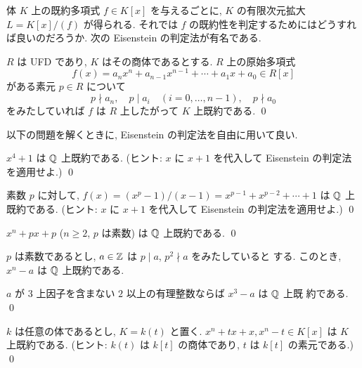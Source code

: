 \documentclass[12pt,twoside]{jarticle}
\begin{document}
体 $K$ 上の既約多項式 $f\in K[x]$ を与えるごとに, 
$K$ の有限次元拡大 $L=K[x]/(f)$ が得られる.
それでは $f$ の既約性を判定するためにはどうすれば良いのだろうか.
次の Eisenstein の判定法が有名である.

\begin{question}
  $R$ は UFD であり, $K$ はその商体であるとする.  
  $R$ 上の原始多項式
  \begin{equation*}
    f(x)= a_n x^n + a_{n-1}x^{n-1} + \cdots + a_1 x + a_0 \in R[x]
  \end{equation*}
  がある素元 $p\in R$ について
  \begin{equation*}
    p\nmid a_n, \quad
    p\mid a_i \quad(i=0,\ldots,n-1), \quad
    p\nmid a_0
  \end{equation*}
  をみたしていれば $f$ は $R$ 上したがって $K$ 上既約である. \qed
\end{question}

以下の問題を解くときに, Eisenstein の判定法を自由に用いて良い.

\begin{question}
  $x^4+1$ は ${\mathbb Q}$ 上既約である. 
  (ヒント: $x$ に $x+1$ を代入して Eisenstein の判定法を適用せよ.) \qed
\end{question}

\begin{question}
  素数 $p$ に対して, $f(x) = (x^p-1)/(x-1) = x^{p-1} + x^{p-2} + \cdots + 1$ 
  は ${\mathbb Q}$ 上既約である. 
  (ヒント: $x$ に $x+1$ を代入して Eisenstein の判定法を適用せよ.) \qed
\end{question}

\begin{question}
  $x^n + px + p$ ($n\ge 2$, $p$ は素数) は ${\mathbb Q}$ 上既約である. \qed
\end{question}

\begin{question}
  $p$ は素数であるとし, $a\in{\mathbb Z}$ は $p\mid a$, $p^2\nmid a$ をみたしていると
  する. このとき, $x^n - a$ は ${\mathbb Q}$ 上既約である.
\end{question}

\begin{question}
  $a$ が $3$ 上因子を含まない $2$ 以上の有理整数ならば $x^3-a$ は ${\mathbb Q}$ 上既
  約である. \qed
\end{question}

\begin{question}
  $k$ は任意の体であるとし, $K=k(t)$ と置く.  
  $x^n + tx + x, x^n - t \in K[x]$ は $K$ 上既約である.
  (ヒント: $k(t)$ は $k[t]$ の商体であり, $t$ は $k[t]$ の素元である.)
  \qed
\end{question}
\end{document}
